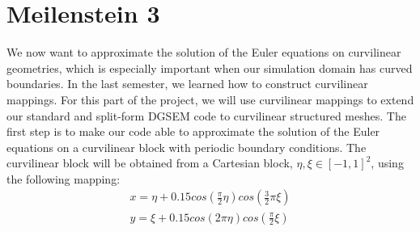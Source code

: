 \documentclass[11pt]{scrartcl}
\begin{document}
\newpage
\section{Meilenstein 3}
We now want to approximate the solution of the Euler equations on curvilinear geometries, which is especially important when our simulation domain has curved boundaries. In the last semester, we learned how to construct curvilinear mappings. For this part of the project, we will use curvilinear mappings to extend our standard and split-form DGSEM code to curvilinear structured meshes. The first step is to make our code able to approximate the solution of the Euler equations on a curvilinear block with periodic boundary conditions. The curvilinear block will be obtained from a Cartesian block, $ \eta, \xi \in [-1, 1]^2$, using the following mapping:
\begin{align*}
x = \eta + 0.15 cos\left(\frac{\pi}{2}\eta \right)cos\left(\frac{3}{2}\pi \xi \right) \\
y = \xi + 0.15 cos\left(2\pi \eta \right) cos\left(\frac{\pi}{2}\xi \right)
\end{align*}
\end{document}
